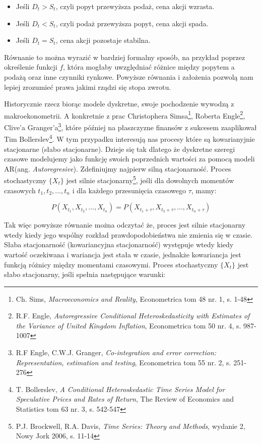 \begin{itemize}
  \item Jeśli \( D_t > S_t \), czyli popyt przewyższa podaż, cena akcji wzrasta.
  \item Jeśli \( D_t < S_t \), czyli podaż przewyższa popyt, cena akcji spada.
  \item Jeśli \( D_t = S_t \), cena akcji pozostaje stabilna.
\end{itemize}
Równanie to można wyrazić w bardziej formalny sposób, na przykład poprzez określenie funkcji \( f \), która mogłaby uwzględniać różnice między popytem a podażą oraz inne czynniki rynkowe. Powyższe równania i założenia pozwolą nam lepiej zrozumieć prawa jakimi rządzi się stopa zwrotu.

Historycznie rzecz biorąc modele dyskretne, swoje pochodzenie wywodzą z makroekonometrii. A konkretnie z prac Christophera Simsa\footnote{Ch. Sims, \textit{Macroeconomics and Reality}, Econometrica tom 48 nr. 1, s. 1-48}, Roberta Engle\footnote{R.F. Engle, \textit{Autoregressive Conditional Heteroskedasticity with Estimates of the Variance of United Kingdom Inflation}, Econometrica tom 50 nr. 4, s. 987-1007}, Clive'a Granger'a\footnote{R.F Engle, C.W.J. Granger, \textit{Co-integration and error correction: Representation, estimation and testing}, Econometrica tom 55 nr. 2, s. 251-276}, które później na płaszczyzne finansów z sukcesem zaaplikował Tim Bollerslev\footnote{T. Bollerslev, \textit{A Conditional Heteroskedastic Time Series Model for Speculative Prices and Rates of Return}, The Review of Economics and Statistics tom 63 nr. 3, s. 542-547}. W tym przypadku interesują nas procesy które są kowarianyjnie stacjonarne (słabo stacjonarne). Dzieje się tak dlatego że dyskretne szeregi czasowe modelujemy jako funkcję swoich poprzednich wartości za pomocą modeli AR(ang. \textit{Autoregresive}). Zdefiniujmy najpierw silną stacjonarność. Proces stochastyczny \( \{X_t\} \) jest silnie stacjonarny\footnote{P.J. Brockwell, R.A. Davis, \textit{Time Series: Theory and Methods}, wydanie 2, Nowy Jork 2006, s. 11-14}, jeśli dla dowolnych momentów czasowych \( t_1, t_2, ..., t_n \) i dla każdego przesunięcia czasowego \( \tau \), mamy:

\begin{equation}
P(X_{t_1}, X_{t_2}, ..., X_{t_n}) = P(X_{t_1 + \tau}, X_{t_2 + \tau}, ..., X_{t_n + \tau})
\end{equation}

Tak więc powyższe równanie można odczytać że, proces jest silnie stacjonarny wtedy kiedy jego wspólny rozkład prawdopodobieństwa nie zmienia się w czasie. Słaba stacjonarność (kowariancyjna stacjonarność) występuje wtedy kiedy wartość oczekiwana i wariancja jest stała w czasie, jednakże kowariancja jest funkcją różnicy między momentami czasowymi. Proces stochastyczny \( \{X_t\} \) jest słabo stacjonarny, jeśli spełnia następujące warunki:

